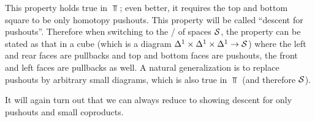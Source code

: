 This property holds true in $\Top$; even better, it requires the top and bottom square to be only homotopy pushouts.
This property will be called ``descent for pushouts''.
Therefore when switching to the \inftycat/ of spaces $\mathcal{S}$, the property can be stated as that in a cube (which is a diagram $\Delta^1\times\Delta^1\times\Delta^1\to\mathcal{S}$) where the left and rear faces are pullbacks and top and bottom faces are pushouts, the front and left faces are pullbacks as well.
A natural generalization is to replace pushouts by arbitrary small diagrams, which is also true in $\Top$ (and therefore $\mathcal{S}$).

It will again turn out that we can always reduce to showing descent for only pushouts and small coproducts.